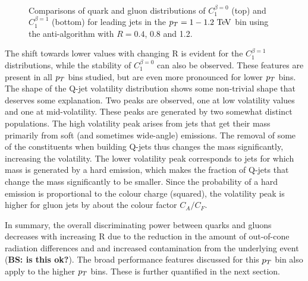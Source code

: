 \begin{figure}
\begin{center}
\\
\caption{Comparisons of quark and gluon distributions of $C_1^{\beta=0}$ (top) and $C_1^{\beta=1}$ (bottom) 
for leading jets in the $\pt=1-1.2 \TeV$ bin using the anti-\kT algorithm with $R=0.4$, 0.8 and 1.2. }
\label{fig:Rdep_qg_C_pt1000}
\end{center}
\end{figure}
The shift towards lower values with changing R is evident for the $C_1^{\beta=1}$ distributions, while the stability
of $C_1^{\beta=0}$ can also be observed. These features are present in all $p_T$ bins studied, but are even more
pronounced for lower $p_T$ bins. The shape of the Q-jet volatility distribution shows some non-trivial shape that
deserves some explanation. Two peaks are observed, one at low volatility values and one at mid-volatility. These
peaks are generated by two somewhat distinct populations. The high volatility peak arises from jets that get their
mass primarily from soft (and sometimes wide-angle) emissions. The removal of some of the constituents when
building Q-jets thus changes the mass significantly, increasing the volatility. The lower volatility peak corresponds
to jets for which mass is generated by a hard emission, which makes the fraction of Q-jets that change 
the mass significantly to be smaller. Since the probability of a hard emission is proportional to the colour
charge (squared),  the volatility peak is higher for gluon jets by about the colour factor $C_A/C_F$. 



In summary, the overall discriminating power between quarks and gluons
 decreases with increasing R due to the reduction in the amount of out-of-cone radiation differences and 
 and increased contamination from the underlying event ({\bf BS: is this ok?}). The broad performance features discussed for this $p_T$ bin also apply to the higher
$p_T$ bins. These  is further quantified in the next section. 


